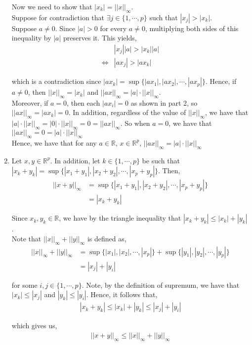 \documentclass[12pt]{article}
\begin{document}
\begin{enumerate}
Now we need to show that $|x_k| = ||x||_{\infty}$.\\

Suppose for contradiction that $\exists j \in \{1, \cdots, p\}$ such that $|x_j| > |x_k|$.\\

Suppose $a \neq 0$. Since $|a| > 0$ for every $a \neq 0$, multiplying both sides of this inequality by $|a|$ preserves it. This yields,
\begin{align*}
&|x_j| |a| > |x_k| |a|\\
\iff &|ax_j| > |ax_k|
\end{align*}

which is a contradiction since $|ax_k| = \sup\{|ax_1|, |ax_2|, \cdots, |ax_p|\}$. Hence, if $a \neq 0$, then $||x||_{\infty} = |x_k|$ and $||ax||_{\infty} = |a| \cdot ||x||_{\infty}$.\\

Moreover, if $a = 0$, then each $|ax_i| = 0$ as shown in part 2, so $||ax||_{\infty} = |ax_k| = 0$. In addition, regardless of the value of $||x||_{\infty}$, we have that $|a| \cdot ||x||_{\infty} = |0| \cdot ||x||_{\infty} = 0 = ||ax||_{\infty}$. So when $a = 0$, we have that $||ax||_{\infty} = 0 = |a| \cdot ||x||_{\infty}$\\

Hence, we have that for any $a \in \mathbb{R}$, $x \in \mathbb{R}^p$, $||ax||_{\infty} = |a| \cdot ||x||_{\infty}$

\item Let $x, y \in \mathbb{R}^p$. In addition, let $k \in \{1, \cdots, p\}$ be such that $|x_k + y_k| = \sup\{|x_1 + y_1|, |x_2 + y_2|, \cdots, |x_p + y_p|\}$. Then,
\begin{align*}
||x + y||_{\infty} &= \sup\{|x_1 + y_1|, |x_2 + y_2|, \cdots, |x_p + y_p|\}\\
&= |x_k + y_k|
\end{align*}

Since $x_k, y_k \in \mathbb{R}$, we have by the triangle inequality that $|x_k + y_k| \leq |x_k| + |y_k|$.\\

Note that $||x||_{\infty} + ||y||_{\infty}$ is defined as,
\begin{align*}
||x||_{\infty} + ||y||_{\infty} &= \sup\{|x_1|, |x_2|, \cdots, |x_p|\} + \sup\{|y_1|, |y_2|, \cdots, |y_p|\}\\
&= |x_j| + |y_i|
\end{align*}

for some $i, j \in \{1, \cdots, p\}$. Note, by the definition of supremum, we have that $|x_k| \leq |x_j|$ and $|y_k| \leq |y_i|$. Hence, it follows that,
\begin{align*}
|x_k + y_k| \leq |x_k| + |y_k| \leq |x_j| + |y_i|
\end{align*}

which gives us,
\begin{align*}
||x + y||_{\infty} \leq ||x||_{\infty} + ||y||_{\infty}
\end{align*}
\end{enumerate}
\end{document}
